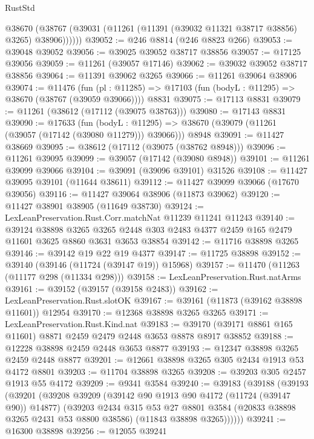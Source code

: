 \begin{lexlean}{RustStd}
\begin{coremodule}
        @38670 (@38767 (@39031 (@11261 (@11391 (@39032 @11321 @38717 @38856) @3265) @38906))))))
@39052 := @246 @8814 (@246 @8823 @266)
@39053 := @39048 @39052
@39056 := @39025 @39052 @38717 @38856
@39057 := @17125 @39056
@39059 := @11261 (@39057 @17146)
@39062 := @39032 @39052 @38717 @38856
@39064 := @11391 @39062 @3265
@39066 := @11261 @39064 @38906
@39074 := @11476
    (fun (pl : @11285) => @17103 (fun (bodyL : @11295) => @38670 (@38767 (@39059 @39066))))
    @8831
@39075 := @17113 @8831
@39079 := @11261 (@38612 (@17112 (@39075 @38763)))
@39080 := @17143 @8831
@39090 := @17633
    (fun (bodyL : @11295) => @38670 (@39079 (@11261 (@39057 (@17142 (@39080 @11279))) @39066)))
    @8948
@39091 := @11427 @38669
@39095 := @38612 (@17112 (@39075 (@38762 @8948)))
@39096 := @11261 @39095
@39099 := @39057 (@17142 (@39080 @8948))
@39101 := @11261 @39099 @39066
@39104 := @39091 (@39096 @39101) @31526
@39108 := @11427 @39095 @39101 (@11644 @38611)
@39112 := @11427 @39099 @39066 (@17670 @39056)
@39116 := @11427 @39064 @38906 (@11873 @39062)
@39120 := @11427 @38901 @38905 (@11649 @38730)
@39124 := LexLeanPreservation.Rust.Corr.matchNat @11239 @11241 @11243
@39140 := @39124
    @38898
    @3265
    @3265
    @2448
    @303
    @2483
    @4377
    @2459
    @165
    @2479
    @11601
    @3625
    @8860
    @3631
    @3653
    @38854
@39142 := @11716 @38898 @3265
@39146 := @39142 @19 @22 @19 @4377
@39147 := @11725 @38898
@39152 := @39140 (@39146 (@11724 (@39147 @19)) @15968)
@39157 := @11470 (@11263 (@11177 @298 (@11334 @298)))
@39158 := LexLeanPreservation.Rust.natArms
@39161 := @39152 (@39157 (@39158 @2483))
@39162 := LexLeanPreservation.Rust.slotOK
@39167 := @39161 (@11873 (@39162 @38898 @11601)) @12954
@39170 := @12368 @38898 @3265 @3265
@39171 := LexLeanPreservation.Rust.Kind.nat
@39183 := @39170 (@39171 @8861 @165 @11601) @8871 @2459 @2479 @2448 @3653 @8878 @8917 @38852
@39188 := @12228 @38898 @2459 @2448 @3653 @8877
@39193 := @12347 @38898 @3265 @2459 @2448 @8877
@39201 := @12661 @38898 @3265 @305 @2434 @1913 @53 @4172 @8801
@39203 := @11704 @38898 @3265
@39208 := @39203 @305 @2457 @1913 @55 @4172
@39209 := @9341 @3584
@39240 := @39183
    (@39188
      (@39193
        (@39201
          (@39208
            @39209
            (@39142 @90 @1913 @90 @4172 (@11724 (@39147 @90)) @14877)
            (@39203
              @2434
              @315
              @53
              @27
              @8801
              @3584
              (@20833 @38898 @3265 @2431 @53 @8800 @38586)
              (@11843 @38898 @3265))))))
@39241 := @16300 @38898
@39256 := @12055
    @39241

\end{coremodule}
\end{lexlean}
